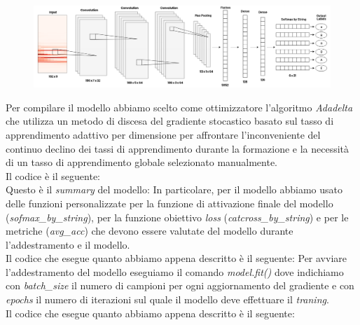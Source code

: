 \begin{figure}[H]
	\centering
	\includegraphics[scale=1.4]{./images/model.png}
\end{figure}
Per compilare il modello abbiamo scelto come ottimizzatore l'algoritmo \textit{Adadelta} che utilizza un metodo di discesa del gradiente stocastico basato sul tasso di apprendimento adattivo per dimensione per affrontare l'inconveniente del continuo declino dei tassi di apprendimento durante la formazione e la necessità di un tasso di apprendimento globale selezionato manualmente.\\
Il codice è il seguente:\\
\newline
\vspace*{2ex}
\vspace*{2ex}
Questo è il \textit{summary} del modello:
\vspace*{2ex}
\vspace*{2ex}
In particolare, per il modello abbiamo usato delle funzioni personalizzate per la funzione di attivazione finale del modello (\textit{sofmax\_by\_string}), per la funzione obiettivo \textit{loss} (\textit{catcross\_by\_string}) e per le metriche (\textit{avg\_acc}) che devono essere valutate del modello durante l'addestramento e il modello.\\
\newline
Il codice che esegue quanto abbiamo appena descritto è il seguente:
\vspace*{2ex}
\vspace*{2ex}
Per avviare l'addestramento del modello eseguiamo il comando \textit{model.fit()} dove indichiamo con \textit{batch\_size} il numero di campioni per ogni aggiornamento del gradiente e con \textit{epochs} il numero di iterazioni sul quale il modello deve effettuare il \textit{traning}.\\
\newline
Il codice che esegue quanto abbiamo appena descritto è il seguente:
\vspace*{2ex}
\vspace*{2ex}
